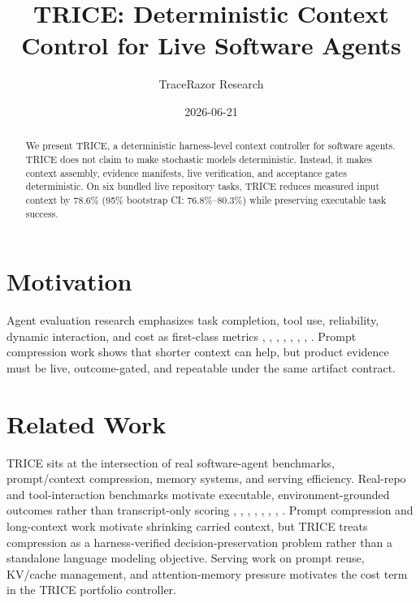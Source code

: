 \documentclass[10pt]{article}
\title{TRICE: Deterministic Context Control for Live Software Agents}
\author{TraceRazor Research}
\date{2026-06-21}
\begin{document}
        \maketitle

        \begin{abstract}
        We present TRICE, a deterministic harness-level context controller for
        software agents. TRICE does not claim to make stochastic models
        deterministic. Instead, it makes context assembly, evidence manifests,
        live verification, and acceptance gates deterministic. On six bundled
        live repository tasks, TRICE reduces measured input context by
        78.6\% (95\% bootstrap CI:
        76.8\%--80.3\%) while preserving
        executable task success.
        \end{abstract}

        \section{Motivation}
        Agent evaluation research emphasizes task completion, tool use,
        reliability, dynamic interaction, and cost as first-class metrics
        \cite{agentsmatter2024}, \cite{acmartifact}, \cite{mohammadi2025agentsurvey}, \cite{complexmcp2026}, \cite{reasonbench2025}, \cite{dfah2026}, \cite{terminalagents2026}, \cite{uncertainty2024}. Prompt compression work shows that shorter context can help,
        but product evidence must be live, outcome-gated, and repeatable under
        the same artifact contract.

        \section{Related Work}
        TRICE sits at the intersection of real software-agent benchmarks,
        prompt/context compression, memory systems, and serving efficiency.
        Real-repo and tool-interaction benchmarks motivate executable,
        environment-grounded outcomes rather than transcript-only scoring
        \cite{swebench2023}, \cite{sweagent2024}, \cite{taubench2024}, \cite{agentbench2023}, \cite{llmlingua2023}, \cite{longllmlingua2023}, \cite{promptcache2023}, \cite{pagedattention2023}. Prompt compression and long-context work motivate
        shrinking carried context, but TRICE treats compression as a
        harness-verified decision-preservation problem rather than a standalone
        language modeling objective. Serving work on prompt reuse, KV/cache
        management, and attention-memory pressure motivates the cost term in
        the TRICE portfolio controller.
\end{document}
